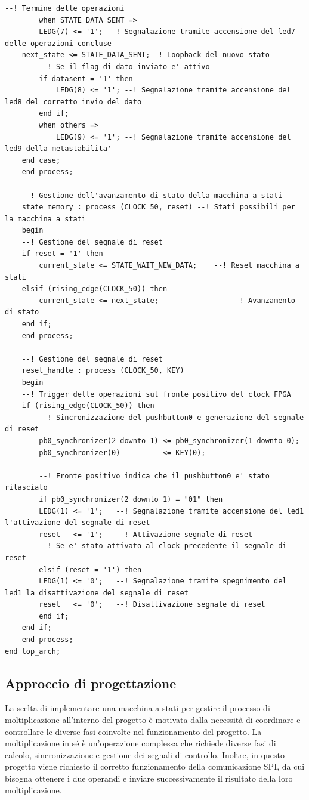 \documentclass[titlepage]{report}
\begin{document}
\begin{lstlisting}[caption={Top level implementato per la nostra architettura}, label={lst:mul16_process}]
		--! Termine delle operazioni
		when STATE_DATA_SENT =>
		LEDG(7) <= '1'; --! Segnalazione tramite accensione del led7 delle operazioni concluse
	next_state <= STATE_DATA_SENT;--! Loopback del nuovo stato
		--! Se il flag di dato inviato e' attivo
		if datasent = '1' then
			LEDG(8) <= '1'; --! Segnalazione tramite accensione del led8 del corretto invio del dato
		end if;
		when others =>
			LEDG(9) <= '1'; --! Segnalazione tramite accensione del led9 della metastabilita'
	end case;
	end process;

	--! Gestione dell'avanzamento di stato della macchina a stati
	state_memory : process (CLOCK_50, reset) --! Stati possibili per la macchina a stati
	begin
	--! Gestione del segnale di reset
	if reset = '1' then
		current_state <= STATE_WAIT_NEW_DATA;    --! Reset macchina a stati
	elsif (rising_edge(CLOCK_50)) then
		current_state <= next_state;			     --! Avanzamento di stato
	end if;
	end process;
	
	--! Gestione del segnale di reset
	reset_handle : process (CLOCK_50, KEY)
	begin
	--! Trigger delle operazioni sul fronte positivo del clock FPGA
	if (rising_edge(CLOCK_50)) then
		--! Sincronizzazione del pushbutton0 e generazione del segnale di reset
		pb0_synchronizer(2 downto 1) <= pb0_synchronizer(1 downto 0);
		pb0_synchronizer(0)          <= KEY(0);

		--! Fronte positivo indica che il pushbutton0 e' stato rilasciato
		if pb0_synchronizer(2 downto 1) = "01" then
		LEDG(1) <= '1';   --! Segnalazione tramite accensione del led1 l'attivazione del segnale di reset
		reset   <= '1';   --! Attivazione segnale di reset
		--! Se e' stato attivato al clock precedente il segnale di reset
		elsif (reset = '1') then
		LEDG(1) <= '0';   --! Segnalazione tramite spegnimento del led1 la disattivazione del segnale di reset
		reset   <= '0';   --! Disattivazione segnale di reset
		end if;
	end if;
	end process;
end top_arch;
		\end{lstlisting}
		\subsection*{Approccio di progettazione}
		\label{subsec:approccio_progettazione}
			La scelta di implementare una macchina a stati per gestire il processo di moltiplicazione all'interno del progetto è motivata dalla necessità di coordinare e controllare le diverse fasi coinvolte nel funzionamento del progetto. La moltiplicazione in sé è un'operazione complessa che richiede diverse fasi di calcolo, sincronizzazione e gestione dei segnali di controllo. Inoltre, in questo progetto viene richiesto il corretto funzionamento della comunicazione SPI, da cui bisogna ottenere i due operandi e inviare successivamente il risultato della loro moltiplicazione.
\end{document}
